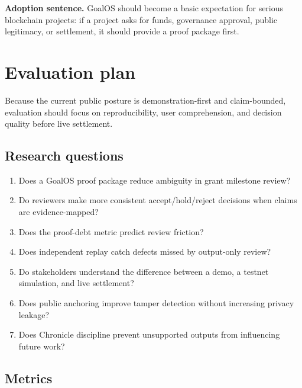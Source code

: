 \documentclass[11pt]{article}
\begin{document}
\begin{prbox}
\textbf{Adoption sentence.} GoalOS should become a basic expectation for serious blockchain projects: if a project asks for funds, governance approval, public legitimacy, or settlement, it should provide a proof package first.
\end{prbox}

\section{Evaluation plan}

Because the current public posture is demonstration-first and claim-bounded, evaluation should focus on reproducibility, user comprehension, and decision quality before live settlement.

\subsection{Research questions}

\begin{enumerate}
  \item Does a GoalOS proof package reduce ambiguity in grant milestone review?
  \item Do reviewers make more consistent accept/hold/reject decisions when claims are evidence-mapped?
  \item Does the proof-debt metric predict review friction?
  \item Does independent replay catch defects missed by output-only review?
  \item Do stakeholders understand the difference between a demo, a testnet simulation, and live settlement?
  \item Does public anchoring improve tamper detection without increasing privacy leakage?
  \item Does Chronicle discipline prevent unsupported outputs from influencing future work?
\end{enumerate}

\subsection{Metrics}
\end{document}
